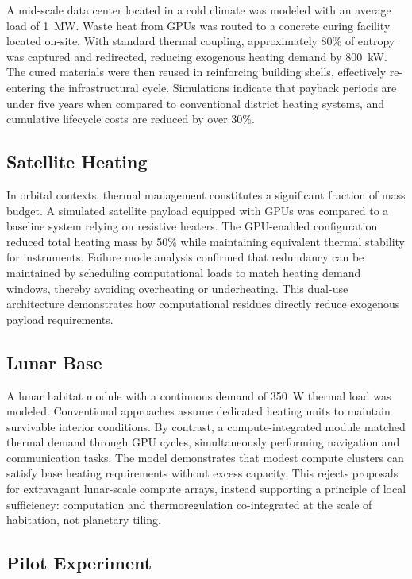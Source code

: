 \documentclass[12pt]{article}
\theoremstyle{plain}
\begin{document}
{{{{{{{{{{{{A mid-scale data center located in a cold climate was modeled with an average load of \SI{1}{\mega\watt}. Waste heat from GPUs was routed to a concrete curing facility located on-site. With standard thermal coupling, approximately 80\% of entropy was captured and redirected, reducing exogenous heating demand by \SI{800}{\kilo\watt}. The cured materials were then reused in reinforcing building shells, effectively re-entering the infrastructural cycle. Simulations indicate that payback periods are under five years when compared to conventional district heating systems, and cumulative lifecycle costs are reduced by over 30\%.

\subsection{Satellite Heating}

In orbital contexts, thermal management constitutes a significant fraction of mass budget. A simulated satellite payload equipped with GPUs was compared to a baseline system relying on resistive heaters. The GPU-enabled configuration reduced total heating mass by 50\% while maintaining equivalent thermal stability for instruments. Failure mode analysis confirmed that redundancy can be maintained by scheduling computational loads to match heating demand windows, thereby avoiding overheating or underheating. This dual-use architecture demonstrates how computational residues directly reduce exogenous payload requirements.

\subsection{Lunar Base}

A lunar habitat module with a continuous demand of \SI{350}{\watt} thermal load was modeled. Conventional approaches assume dedicated heating units to maintain survivable interior conditions. By contrast, a compute-integrated module matched thermal demand through GPU cycles, simultaneously performing navigation and communication tasks. The model demonstrates that modest compute clusters can satisfy base heating requirements without excess capacity. This rejects proposals for extravagant lunar-scale compute arrays, instead supporting a principle of local sufficiency: computation and thermoregulation co-integrated at the scale of habitation, not planetary tiling.

\subsection{Pilot Experiment}

}}}}}}}}}}}}
\end{document}
